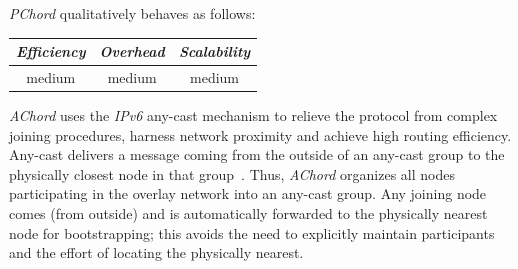 \emph{PChord} qualitatively behaves as follows:
\begin{center}
{\footnotesize
\begin{tabular}{ccc}
\emph{Efficiency} & \emph{Overhead} & \emph{Scalability} \\
\hline
medium &
medium &
medium
\end{tabular}
}
\end{center}

\emph{AChord} \cite{DK2006} uses the {\sl IPv6} any-cast mechanism to
relieve the protocol from complex joining procedures,
harness network proximity and achieve high routing efficiency. 
Any-cast delivers a message coming from the outside of 
an any-cast group to the physically closest node in
that group~\cite{M2002}. Thus, \emph{AChord} organizes all nodes participating
in the overlay network into an any-cast group. Any joining node comes (from
outside) and is automatically forwarded to the physically nearest node for
bootstrapping; this avoids the need to explicitly maintain participants
and the effort of locating the physically nearest. 

